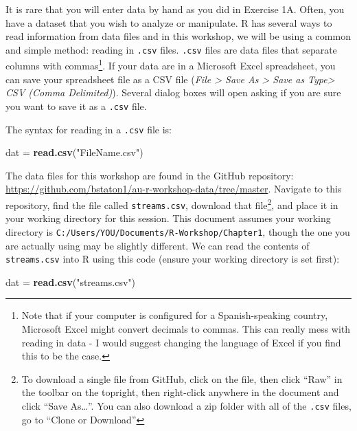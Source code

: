 \documentclass[]{book}
\newenvironment{Shaded}{\begin{snugshade}}{\end{snugshade}}
\newcommand{\KeywordTok}[1]{\textcolor[rgb]{0.13,0.29,0.53}{\textbf{#1}}}
\newcommand{\StringTok}[1]{\textcolor[rgb]{0.31,0.60,0.02}{#1}}
\newcommand{\NormalTok}[1]{#1}
\let\rmarkdownfootnote\footnote%
\def\footnote{\protect\rmarkdownfootnote}
\theoremstyle{definition}
\theoremstyle{definition}
\theoremstyle{definition}
\theoremstyle{remark}
\begin{document}
It is rare that you will enter data by hand as you did in Exercise 1A.
Often, you have a dataset that you wish to analyze or manipulate. R has
several ways to read information from data files and in this workshop,
we will be using a common and simple method: reading in \texttt{.csv}
files. \texttt{.csv} files are data files that separate columns with
commas\footnote{Note that if your computer is configured for a
  Spanish-speaking country, Microsoft Excel might convert decimals to
  commas. This can really mess with reading in data - I would suggest
  changing the language of Excel if you find this to be the case.}. If
your data are in a Microsoft Excel spreadsheet, you can save your
spreadsheet file as a CSV file (\emph{File \textgreater{} Save As
\textgreater{} Save as Type\textgreater{} CSV (Comma Delimited)}).
Several dialog boxes will open asking if you are sure you want to save
it as a \texttt{.csv} file.

The syntax for reading in a \texttt{.csv} file is:

\begin{Shaded}
\begin{Highlighting}[]
\NormalTok{dat =}\StringTok{ }\KeywordTok{read.csv}\NormalTok{(}\StringTok{"FileName.csv"}\NormalTok{)}
\end{Highlighting}
\end{Shaded}

The data files for this workshop are found in the GitHub repository:
\url{https://github.com/bstaton1/au-r-workshop-data/tree/master}.
Navigate to this repository, find the file called \texttt{streams.csv},
download that file\footnote{To download a single file from GitHub, click
  on the file, then click ``Raw'' in the toolbar on the topright, then
  right-click anywhere in the document and click ``Save As\ldots{}''.
  You can also download a zip folder with all of the \texttt{.csv}
  files, go to ``Clone or Download''}, and place it in your working
directory for this session. This document assumes your working directory
is \texttt{C:/Users/YOU/Documents/R-Workshop/Chapter1}, though the one
you are actually using may be slightly different. We can read the
contents of \texttt{streams.csv} into R using this code (ensure your
working directory is set first):

\begin{Shaded}
\begin{Highlighting}[]
\NormalTok{dat =}\StringTok{ }\KeywordTok{read.csv}\NormalTok{(}\StringTok{"streams.csv"}\NormalTok{)}
\end{Highlighting}
\end{Shaded}
\end{document}
